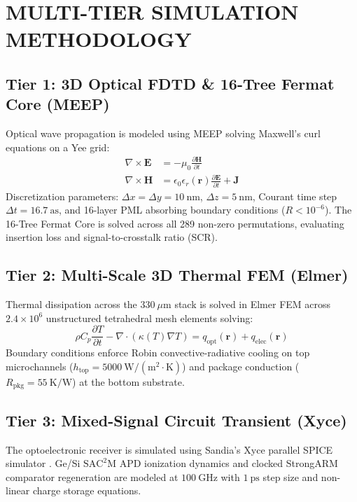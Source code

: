 \documentclass[journal]{IEEEtran}
\begin{document}
\section{MULTI-TIER SIMULATION METHODOLOGY}

\subsection{Tier 1: 3D Optical FDTD \& 16-Tree Fermat Core (MEEP)}
Optical wave propagation is modeled using MEEP \cite{Oskooi2010} solving Maxwell's curl equations on a Yee grid:
\begin{align}
    \nabla \times \mathbf{E} &= -\mu_0 \frac{\partial \mathbf{H}}{\partial t} \\
    \nabla \times \mathbf{H} &= \epsilon_0 \epsilon_r(\mathbf{r}) \frac{\partial \mathbf{E}}{\partial t} + \mathbf{J}
\end{align}
Discretization parameters: $\Delta x = \Delta y = 10~\mathrm{nm}$, $\Delta z = 5~\mathrm{nm}$, Courant time step $\Delta t = 16.7~\mathrm{as}$, and 16-layer PML absorbing boundary conditions ($R < 10^{-6}$). The 16-Tree Fermat Core is solved across all 289 non-zero permutations, evaluating insertion loss and signal-to-crosstalk ratio (SCR).

\subsection{Tier 2: Multi-Scale 3D Thermal FEM (Elmer)}
Thermal dissipation across the $330~\mu\mathrm{m}$ stack is solved in Elmer FEM \cite{Raback2013} across $2.4 \times 10^6$ unstructured tetrahedral mesh elements solving:
\begin{equation}
    \rho C_p \frac{\partial T}{\partial t} - \nabla \cdot (\kappa(T) \nabla T) = q_{\mathrm{opt}}(\mathbf{r}) + q_{\mathrm{elec}}(\mathbf{r})
\end{equation}
Boundary conditions enforce Robin convective-radiative cooling on top microchannels ($h_{\mathrm{top}} = 5000~\mathrm{W/(m^2\cdot K)}$) and package conduction ($R_{\mathrm{pkg}} = 55~\mathrm{K/W}$) at the bottom substrate.

\subsection{Tier 3: Mixed-Signal Circuit Transient (Xyce)}
The optoelectronic receiver is simulated using Sandia's Xyce parallel SPICE simulator \cite{Hutchinson2002}. Ge/Si $\mathrm{SAC^2M}$ APD ionization dynamics and clocked StrongARM comparator regeneration \cite{Razavi2015} are modeled at $100~\mathrm{GHz}$ with $1~\mathrm{ps}$ step size and non-linear charge storage equations.
\end{document}
